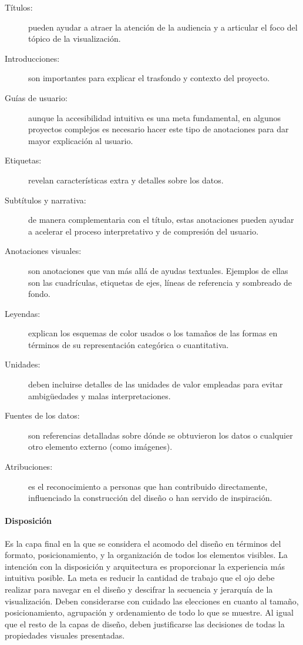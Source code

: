 \begin{description}
  \item[Títulos:] pueden ayudar a atraer la atención de la audiencia y a articular el foco del tópico de la visualización.
  \item[Introducciones:] son importantes para explicar el trasfondo y contexto del proyecto.
  \item[Guías de usuario:] aunque la accesibilidad intuitiva es una meta fundamental, en algunos proyectos complejos es necesario hacer este tipo de anotaciones para dar mayor explicación al usuario.
  \item[Etiquetas:] revelan características extra y detalles sobre los datos.
  \item[Subtítulos y narrativa:] de manera complementaria con el título, estas anotaciones pueden ayudar a acelerar el proceso interpretativo y de compresión del usuario.
  \item[Anotaciones visuales:] son anotaciones que van más allá de ayudas textuales. Ejemplos de ellas son las cuadrículas, etiquetas de ejes, líneas de referencia y sombreado de fondo.
  \item[Leyendas:] explican los esquemas de color usados o los tamaños de las formas en términos de su representación categórica o cuantitativa.
  \item[Unidades:] deben incluirse detalles de las unidades de valor empleadas para evitar ambigüedades y malas interpretaciones.
  \item[Fuentes de los datos:] son referencias detalladas sobre dónde se obtuvieron los datos o cualquier otro elemento externo (como imágenes).
  \item[Atribuciones:] es el reconocimiento a personas que han contribuido directamente, influenciado la construcción del diseño o han servido de inspiración.
\end{description}

\paragraph{Disposición}

Es la capa final en la que se considera el acomodo del diseño en términos del formato, posicionamiento, y la organización de todos los elementos visibles. La intención con la disposición y arquitectura es proporcionar la experiencia más intuitiva posible. La meta es reducir la cantidad de trabajo que el ojo debe realizar para navegar en el diseño y descifrar la secuencia y jerarquía de la visualización. Deben considerarse con cuidado las elecciones en cuanto al tamaño, posicionamiento, agrupación y ordenamiento de todo lo que se muestre. Al igual que el resto de la capas de diseño, deben justificarse las decisiones de todas la propiedades visuales presentadas.

